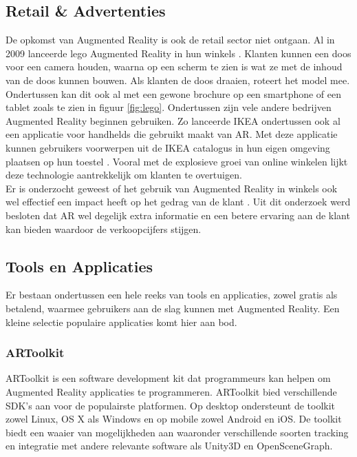 \documentclass[pdftex,a4paper,12pt,twoside]{report}
\begin{document}
\subsection{Retail \& Advertenties}
De opkomst van Augmented Reality is ook de retail sector niet ontgaan. Al in 2009 lanceerde lego Augmented Reality in hun winkels \citep{lego}. Klanten kunnen een doos voor een camera houden, waarna op een scherm te zien is wat ze met de inhoud van de doos kunnen bouwen. Als klanten de doos draaien, roteert het model mee. Ondertussen kan dit ook al met een gewone brochure op een smartphone of een tablet zoals te zien in figuur \ref{fig:lego}. Ondertussen zijn vele andere bedrijven Augmented Reality beginnen gebruiken. Zo lanceerde IKEA ondertussen ook al een applicatie voor handhelds die gebruikt maakt van AR. Met deze applicatie kunnen gebruikers voorwerpen uit de IKEA catalogus in hun eigen omgeving plaatsen op hun toestel \citep{ikea}. Vooral met de explosieve groei van online winkelen \citep{webshops} lijkt deze technologie aantrekkelijk om klanten te overtuigen.\\

Er is onderzocht geweest of het gebruik van Augmented Reality in winkels ook wel effectief een impact heeft op het gedrag van de klant \citep{cuomo2015augmented}. Uit dit onderzoek werd besloten dat AR wel degelijk extra informatie en een betere ervaring aan de klant kan bieden waardoor de verkoopcijfers stijgen.

\subsection{Tools en Applicaties}
\label{sec:tools}
Er bestaan ondertussen een hele reeks van tools en applicaties, zowel gratis als betalend, waarmee gebruikers aan de slag kunnen met Augmented Reality. Een kleine selectie populaire applicaties komt hier aan bod.

\subsubsection{ARToolkit}
ARToolkit is een software development kit dat programmeurs kan helpen om Augmented Reality applicaties te programmeren. ARToolkit bied verschillende SDK's aan voor de populairste platformen. Op desktop ondersteunt de toolkit zowel Linux, OS X als Windows en op mobile zowel Android en iOS. De toolkit biedt een waaier van mogelijkheden aan waaronder verschillende soorten tracking en integratie met andere relevante software als Unity3D en OpenSceneGraph. \\
\end{document}
